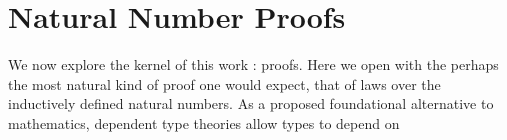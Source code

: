 \section{Natural Number Proofs}

We now explore the kernel of this work : proofs. Here we open with the perhaps
the most natural kind of proof one would expect, that of laws over the
inductively defined natural numbers. As a proposed foundational alternative to
mathematics, dependent type theories allow types to depend on  
